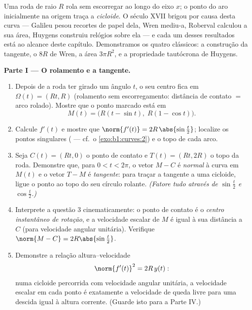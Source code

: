 \begin{problem}\label{pb:b1:curves:1}
Uma roda de raio $R$ rola sem escorregar ao longo do eixo $x$; o
ponto do aro inicialmente na origem traça a \emph{cicloide}. O século
XVII brigou por causa desta curva --- Galileu pesou recortes de papel
dela, Wren mediu-a, Roberval calculou a sua área, Huygens construiu
relógios sobre ela --- e cada um desses resultados está ao alcance
deste capítulo. Demonstramos os quatro clássicos: a construção da
tangente, o  $8R$ de Wren, a área $3\pi R^2$, e a propriedade
tautócrona de Huygens.

\medskip
\noindent\textbf{Parte I --- O rolamento e a tangente.}
\begin{enumerate}
  \item Depois de a roda ter girado um ângulo $t$, o seu centro fica
        em $\Omega(t) = (Rt, R)$ (rolamento sem escorregamento: distância de contato
        $=$ arco rolado). Mostre que o ponto marcado está em
        \[
        M(t) = \bigl(R(t - \sin t),\; R(1 - \cos t)\bigr).
        \]
  \item Calcule $f'(t)$ e mostre que $\norm{f'(t)} =
        2R\,\abs{\sin\frac t2}$; localize os pontos
        singulares ( --- cf.\ o \cref{exo:b1:curves:2}) e o topo de cada
        arco.
  \item Seja $C(t) = (Rt, 0)$ o ponto de contato e $T(t) =
        (Rt, 2R)$ o topo da roda.
        Demonstre que, para $0 < t <
        2\pi$, o vetor $M - C$ é \emph{normal} à
        curva em $M(t)$ e o vetor $T - M$ é \emph{tangente}: para
        traçar a tangente a uma cicloide, ligue o ponto ao topo do
        seu círculo rolante. \emph{(Fatore tudo através de $\sin\frac t2$ e
        $\cos\frac t2$.)}
  \item Interprete a questão 3 cinematicamente: o ponto de contato é
        o \emph{centro instantâneo de rotação}, e a velocidade
        escalar de $M$ é igual à sua distância a $C$ (para velocidade
        angular unitária). Verifique $\norm{M - C} = 2R\abs{\sin\frac t2}$.
  \item Demonstre a relação altura--velocidade
        \[
        \norm{f'(t)}^2 = 2R\,y(t) :
        \]
        numa cicloide percorrida com velocidade angular unitária, a
        velocidade escalar em cada ponto é exatamente a velocidade de
        queda livre para uma descida igual à altura corrente. (Guarde
        isto para a Parte IV.)
\end{enumerate}


\end{problem}

